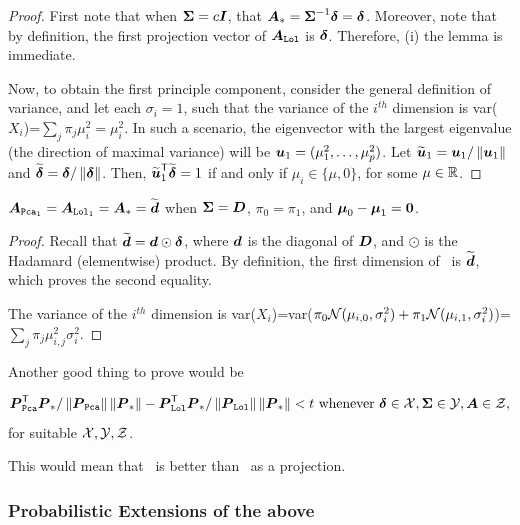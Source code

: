 \documentclass[10pt]{article}
\begin{document}
\begin{proof}
First note that when $\boldsymbol{\Sigma}=c \boldsymbol{I}$, that $\boldsymbol{A}_* = \boldsymbol{\Sigma}^{-1} \boldsymbol{\delta} = \boldsymbol{\delta}$.
Moreover, note that by definition, the first projection vector of $\boldsymbol{A}_{{\sc \texttt{Lol}}}$ is $\boldsymbol{\delta}$.
Therefore, (i) the lemma is immediate.

Now, to obtain the first principle component, consider the general definition of variance, 
and let each $\sigma_i=1$, such that  the variance of the $i^{th}$ dimension is var($X_i$)=$\sum_j \pi_j \mu_i^2=\mu_i^2$.    
In such a scenario, the eigenvector with the largest eigenvalue  (the direction of maximal variance) will be 
$\boldsymbol{u}_1=(\mu_1^2,\ldots, \mu_p^2)$.
Let $\widetilde{\boldsymbol{u}}_1=\boldsymbol{u}_1/\left \lVert\boldsymbol{u}_1 \right \rVert$ and $\widetilde{\boldsymbol{\delta}}=\boldsymbol{\delta}/\left \lVert\boldsymbol{\delta} \right \rVert$. 
Then, $\widetilde{\boldsymbol{u}}_1^{\mathsf{T}} \widetilde{\boldsymbol{\delta}}=1$ if and only if $\mu_i \in \{\mu,0\}$, for some $\mu \in \mathbb{R}$.
\end{proof}


\begin{lem}
$\boldsymbol{A}_{{\sc \texttt{Pca}}_1}=\boldsymbol{A}_{{\sc \texttt{Lol}}_1}=\boldsymbol{A}_*=\widetilde{\boldsymbol{d}}$ when $\boldsymbol{\Sigma}=\boldsymbol{D}$, $\pi_0=\pi_1$, and $\boldsymbol{\mu}_0-\boldsymbol{\mu}_1=\boldsymbol{0}$.
\end{lem}
\begin{proof}
Recall that $\widetilde{\boldsymbol{d}}=\boldsymbol{d} \odot \boldsymbol{\delta}$, where $\boldsymbol{d}$ is the diagonal of $\boldsymbol{D}$, and $\odot$ is the Hadamard (elementwise) product.  By definition, the first dimension of \Lol~is $\widetilde{\boldsymbol{d}}$, which proves the second equality.


The variance of the $i^{th}$ dimension is var($X_i$)=var($\pi_0 \mathcal{N}(\mu_{i,0},\sigma_i^2) + \pi_1 \mathcal{N}(\mu_{i,1},\sigma_i^2)$)= $\sum_j \pi_j \mu_{i,j}^2 \sigma_i^2$.   
\end{proof}

Another good thing to prove would be 
\begin{thm}
\begin{align*}
\boldsymbol{P}_{{\sc \texttt{Pca}}}^{\mathsf{T}} \boldsymbol{P}_* /\left \lVert\boldsymbol{P}_{{\sc \texttt{Pca}}} \right \rVert \left \lVert\boldsymbol{P}_* \right \rVert - \boldsymbol{P}_{{\sc \texttt{Lol}}}^{\mathsf{T}} \boldsymbol{P}_* /\left \lVert\boldsymbol{P}_{{\sc \texttt{Lol}}} \right \rVert \left \lVert\boldsymbol{P}_* \right \rVert < t  \text{ whenever } \boldsymbol{\delta} \in \mathcal{X}, \boldsymbol{\Sigma} \in \mathcal{Y}, \boldsymbol{A} \in \mathcal{Z},
\end{align*}
for suitable $\mathcal{X}, \mathcal{Y}, \mathcal{Z}$.
\end{thm}
This would mean that \Lol~is better than \Pca~as a projection.





\subsubsection{Probabilistic Extensions of the above}
\end{document}
